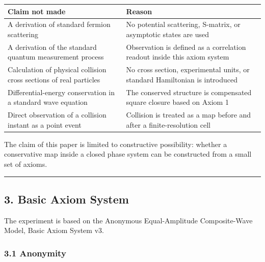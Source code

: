 \documentclass[
  a4paper,
]{article}
\newcounter{none} %
\begin{document}
{\def\LTcaptype{none} %
\begin{longtable}[]{@{}
  >{\raggedright\arraybackslash}p{}
  >{\raggedright\arraybackslash}p{}@{}}
\toprule\noalign{}
\begin{minipage}[b]{\linewidth}\raggedright
Claim not made
\end{minipage} & \begin{minipage}[b]{\linewidth}\raggedright
Reason
\end{minipage} \\
\midrule\noalign{}
\endhead
\bottomrule\noalign{}
\endlastfoot
A derivation of standard fermion scattering & No potential scattering,
S-matrix, or asymptotic states are used \\
A derivation of the standard quantum measurement process & Observation
is defined as a correlation readout inside this axiom system \\
Calculation of physical collision cross sections of real particles & No
cross section, experimental units, or standard Hamiltonian is
introduced \\
Differential-energy conservation in a standard wave equation & The
conserved structure is compensated square closure based on Axiom 1 \\
Direct observation of a collision instant as a point event & Collision
is treated as a map before and after a finite-resolution cell \\
\end{longtable}
}

The claim of this paper is limited to constructive possibility: whether
a conservative map inside a closed phase system can be constructed from
a small set of axioms.

\begin{center}\rule{0.5\linewidth}{0.5pt}\end{center}

\subsection{3. Basic Axiom System}\label{basic-axiom-system}

The experiment is based on the Anonymous Equal-Amplitude Composite-Wave
Model, Basic Axiom System v3.

\subsubsection{3.1 Anonymity}\label{anonymity}
\end{document}
